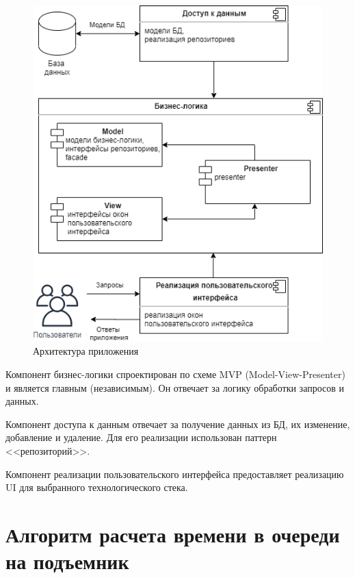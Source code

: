 \begin{figure}[h!]
	\begin{center}
		\includegraphics[scale=0.7]{../imgs/uml/components.png}
	\end{center}
	\captionsetup{justification=centering}
	\caption{Архитектура приложения}
	\label{img:components}
\end{figure}

Компонент бизнес-логики спроектирован по схеме MVP (Model-View-Presenter) и является главным (независимым). Он отвечает за логику обработки запросов и данных.

Компонент доступа к данным отвечает за получение данных из БД, их изменение, добавление и удаление. Для его реализации использован паттерн <<репозиторий>>. 

Компонент реализации пользовательского интерфейса предоставляет реализацию UI для выбранного технологического стека.

\section{Алгоритм расчета времени в очереди на подъемник}\label{func_label}



